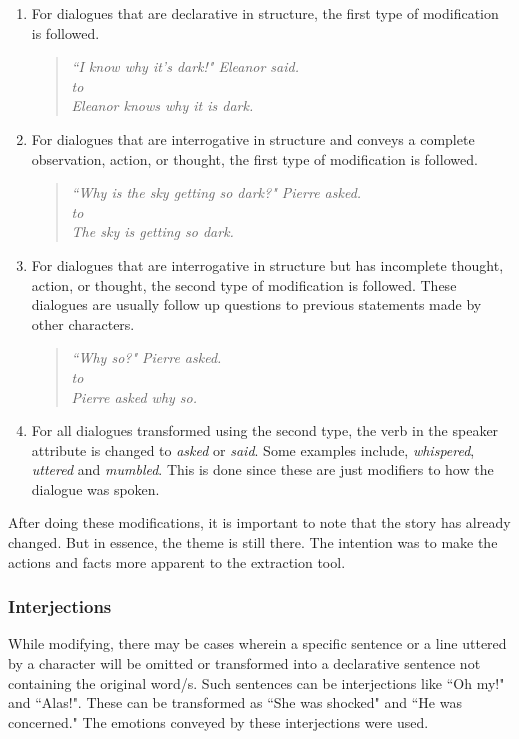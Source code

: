 \begin{enumerate}
   \item For dialogues that are declarative in structure, the first type of modification is followed.
\begin{verse}
\itshape
\centering
``I know why it's dark!" Eleanor said. \\
to \\
Eleanor knows why it is dark. \\
\end{verse}
   \item For dialogues that are interrogative in structure and conveys a complete observation, action, or thought, the first type of modification is followed.
\begin{verse}
\itshape
\centering
``Why is the sky getting so dark?" Pierre asked. \\
to \\
The sky is getting so dark.\\
\end{verse}
   \item For dialogues that are interrogative in structure but has incomplete thought, action, or thought, the second type of modification is followed. These dialogues are usually follow up questions to previous statements made by other characters.
\begin{verse}
\itshape
\centering
``Why so?" Pierre asked. \\
to \\
Pierre asked why so.\\
\end{verse}
	\item For all dialogues transformed using the second type, the verb in the speaker attribute is changed to \textit{asked} or \textit{said}. Some examples include, \textit{whispered}, \textit{uttered} and \textit{mumbled}. This is done since these are just modifiers to how the dialogue was spoken. 
\end{enumerate}

After doing these modifications, it is important to note that the story has already changed. But in essence, the theme is still there. The intention was to make the actions and facts more apparent to the extraction tool. 

\subsubsection*{Interjections}

While modifying, there may be cases wherein a specific sentence or a line uttered by a character will be omitted or transformed into a declarative sentence not containing the original word/s. Such sentences can be interjections like ``Oh my!" and ``Alas!". These can be transformed as ``She was shocked" and ``He was concerned." The emotions conveyed by these interjections were used.

